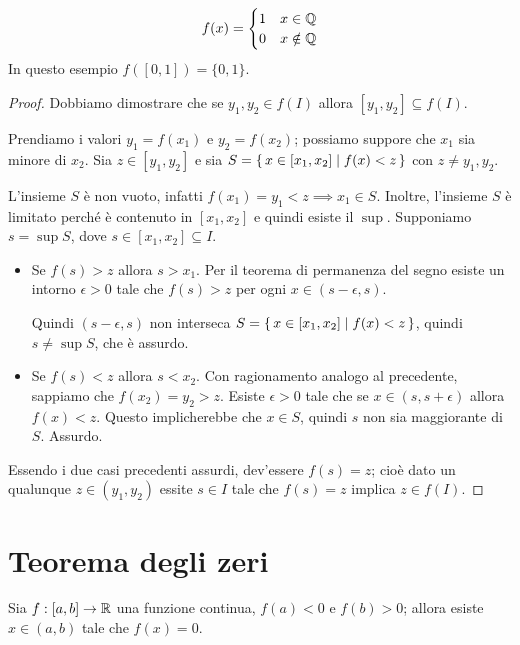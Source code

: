 \begin{example}
\begin{equation*}
f(x) = \begin{cases}
1 & x \in \mathbb Q \\
0 & x \notin \mathbb Q
\end{cases}
\end{equation*}
In questo esempio $f([0,1]) = \{0, 1\}$.
\end{example}

\begin{proof}
Dobbiamo dimostrare che se $y_1, y_2 \in f(I)$ allora $[y_1, y_2] \subseteq f(I)$. 

Prendiamo i valori $y_1 = f(x_1)$ e $y_2 = f(x_2)$; possiamo suppore che $x_1$ sia minore di $x_2$. Sia $z \in [y_1, y_2]$ e sia $S = \set{x \in [x_1, x_2] | f(x) < z}$ con $z \neq y_1, y_2$.

L'insieme $S$ è non vuoto, infatti $f(x_1) = y_1 < z \implies x_1 \in S$. Inoltre, l'insieme $S$ è limitato perché è contenuto in $[x_1, x_2]$ e quindi esiste il $\sup$. Supponiamo $s = \sup S$, dove $s \in [x_1, x_2] \subseteq I$.

\begin{itemize}
\item Se $f(s) > z$ allora $s > x_1$. Per il teorema di permanenza del segno esiste un intorno $\epsilon > 0$ tale che $f(s) > z$ per ogni $x \in (s - \epsilon, s)$.

Quindi $(s-\epsilon, s)$ non interseca $S = \set{x \in [x_1, x_2] | f(x) < z}$, quindi $s \neq \sup S$, che è assurdo.

\item Se $f(s) < z$ allora $s < x_2$. Con ragionamento analogo al precedente, sappiamo che $f(x_2) = y_2 > z$. Esiste $\epsilon > 0$ tale che se $x \in (s, s+\epsilon)$ allora $f(x) < z$. Questo implicherebbe che $x \in S$, quindi $s$ non sia maggiorante di $S$. Assurdo.
\end{itemize}

Essendo i due casi precedenti assurdi, dev'essere $f(s) = z$; cioè dato un qualunque $z \in (y_1, y_2)$ essite $s \in I$ tale che $f(s) = z$ implica $z \in f(I)$.

\end{proof}

\section{Teorema degli zeri}
\begin{theorem}
Sia $f : [a,b] \to \mathbb R$ una funzione continua, $f(a) < 0$ e $f(b) > 0$; allora esiste $x \in (a, b)$ tale che $f(x) = 0$.
\end{theorem}

